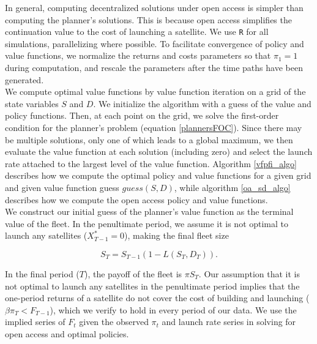 \documentclass[12pt]{article}
\begin{document}
In general, computing decentralized solutions under open access is simpler than computing the planner's solutions. This is because open access simplifies the continuation value to the cost of launching a satellite. We use \texttt{R} for all simulations, parallelizing where possible. To facilitate convergence of policy and value functions, we normalize the returns and costs parameters so that $\pi_1 = 1$ during computation, and rescale the parameters after the time paths have been generated. \\

We compute optimal value functions by value function iteration on a grid of the state variables $S$ and $D$. We initialize the algorithm with a guess of the value and policy functions. Then, at each point on the grid, we solve the first-order condition for the planner's problem (equation \ref{plannersFOC}). Since there may be multiple solutions, only one of which leads to a global maximum, we then evaluate the value function at each solution (including zero) and select the launch rate attached to the largest level of the value function. Algorithm \ref{vfpfi_algo} describes how we compute the optimal policy and value functions for a given grid and given value function guess $guess(S,D)$, while algorithm \ref{oa_sd_algo} describes how we compute the open access policy and value functions. \\

We construct our initial guess of the planner's value function as the terminal value of the fleet. In the penultimate period, we assume it is not optimal to launch any satellites ($X^*_{T-1} = 0$), making the final fleet size 

\[ S_T = S_{T-1}(1-L(S_T,D_T)) .\]

In the final period ($T$), the payoff of the fleet is $\pi S_T$. Our assumption that it is not optimal to launch any satellites in the penultimate period implies that the one-period returns of a satellite do not cover the cost of building and launching ($\beta \pi_T < F_{T-1}$), which we verify to hold in every period of our data. We use the implied series of $F_t$ given the observed $\pi_t$ and launch rate series in solving for open access and optimal policies.

\end{document}
